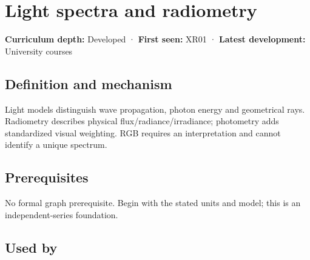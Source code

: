 \hypertarget{appendix-215c2570199b}{}\label{referencestart:appendix-215c2570199b}
\section{Light spectra and radiometry}\label{appendix-215c2570199b-light-spectra-and-radiometry}

\hypertarget{appendix-215c2570199b-light-spectra-and-radiometry}{}

\textbf{Curriculum depth:} Developed · \textbf{First seen:} XR01 · \textbf{Latest development:} University courses

\begin{allmightroledefinition}

\subsection{Definition and mechanism}\label{appendix-215c2570199b-definition-and-mechanism}

\hypertarget{appendix-215c2570199b-definition-and-mechanism}{}

Light models distinguish wave propagation, photon energy and geometrical rays. Radiometry describes physical flux/radiance/irradiance; photometry adds standardized visual weighting. RGB requires an interpretation and cannot identify a unique spectrum.

\end{allmightroledefinition}

\subsection{Prerequisites}\label{appendix-215c2570199b-prerequisites}

\hypertarget{appendix-215c2570199b-prerequisites}{}

No formal graph prerequisite. Begin with the stated units and model; this is an independent-series foundation.

\subsection{Used by}\label{appendix-215c2570199b-used-by}

\hypertarget{appendix-215c2570199b-used-by}{}

